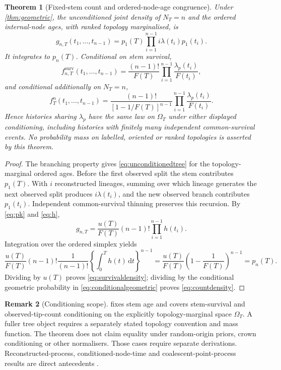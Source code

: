 \documentclass[11pt]{article}
\newtheorem{theorem}{Theorem}
\theoremstyle{definition}
\newtheorem{remark}[theorem]{Remark}
\newcommand{\dd}{\,\mathrm{d}}
\begin{document}
\begin{theorem}[Fixed-stem count and ordered-node-age congruence]\label{thm:fixedstem}
Under \cref{thm:geometric}, the unconditioned joint density of $N_T=n$ and the ordered internal-node ages, with ranked topology marginalised, is
\begin{equation}
 g_{n,T}(t_1,\ldots,t_{n-1})=p_1(T)\prod_{i=1}^{n-1}i\lambda(t_i)p_1(t_i). \label{eq:unconditionedtree}
\end{equation}
It integrates to $p_n(T)$. Conditional on stem survival,
\begin{equation}
 f^{\mathrm{surv}}_{n,T}(t_1,\ldots,t_{n-1})
 =\frac{(n-1)!}{F(T)}\prod_{i=1}^{n-1}\frac{\lambda_p(t_i)}{F(t_i)}, \label{eq:survivaldensity}
\end{equation}
and conditional additionally on $N_T=n$,
\begin{equation}
 f^n_T(t_1,\ldots,t_{n-1})
 =\frac{(n-1)!}{[1-1/F(T)]^{n-1}}
 \prod_{i=1}^{n-1}\frac{\lambda_p(t_i)}{F(t_i)}. \label{eq:countdensity}
\end{equation}
Hence histories sharing $\lambda_p$ have the same law on $\Omega_T$ under either displayed conditioning, including histories with finitely many independent common-survival events. No probability mass on labelled, oriented or ranked topologies is asserted by this theorem.
\end{theorem}

\begin{proof}
The branching property gives \eqref{eq:unconditionedtree} for the topology-marginal ordered ages. Before the first observed split the stem contributes $p_1(T)$. With $i$ reconstructed lineages, summing over which lineage generates the next observed split produces $i\lambda(t_i)$, and the new observed branch contributes $p_1(t_i)$. Independent common-survival thinning preserves this recursion. By \eqref{eq:pk} and \eqref{eq:h},
\[
 g_{n,T}=\frac{u(T)}{F(T)}(n-1)!\prod_{i=1}^{n-1}h(t_i).
\]
Integration over the ordered simplex yields
\[
 \frac{u(T)}{F(T)}(n-1)!\frac1{(n-1)!}
 \left\{\int_0^Th(t)\dd t\right\}^{n-1}
 =\frac{u(T)}{F(T)}\left(1-\frac1{F(T)}\right)^{n-1}=p_n(T).
\]
Dividing by $u(T)$ proves \eqref{eq:survivaldensity}; dividing by the conditional geometric probability in \eqref{eq:conditionalgeometric} proves \eqref{eq:countdensity}.
\end{proof}

\begin{remark}[Conditioning scope]\label{rem:scope}
 fixes stem age and covers stem-survival and observed-tip-count conditioning on the explicitly topology-marginal space $\Omega_T$. A fuller tree object requires a separately stated topology convention and mass function. The theorem does not claim equality under random-origin priors, crown conditioning or other normalisers. Those cases require separate derivations. Reconstructed-process, conditioned-node-time and coalescent-point-process results are direct antecedents \parencite{nee1994,gernhard2008,stadler2010,lambert2013,hohna2015,stadlersteel2019,macpherson2022}.
\end{remark}
\end{document}

